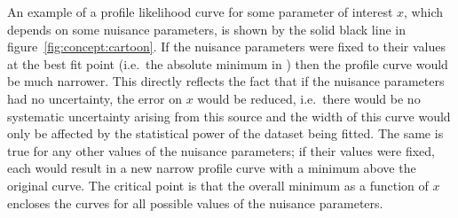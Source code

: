 An example of a profile likelihood curve for some parameter of interest $x$,
which depends on some nuisance parameters,
is shown by the solid black line in figure~\ref{fig:concept:cartoon}. If the
nuisance parameters were fixed to their values at the best fit point (i.e.~the
absolute minimum in \nll) then the profile \nll curve would be much narrower.
This directly reflects the fact that
if the nuisance parameters had no uncertainty,
the error on $x$ would be reduced, i.e.~there would be no systematic
uncertainty arising from this source and the width of this curve would only
be affected by the statistical power of the dataset being fitted.
The same is true for any other values of the nuisance parameters; if their values
were fixed, each would result in a new narrow profile curve with a minimum above the original
curve. The critical point is that the overall minimum as a function
of $x$ encloses the curves for all possible values of the nuisance
parameters.

